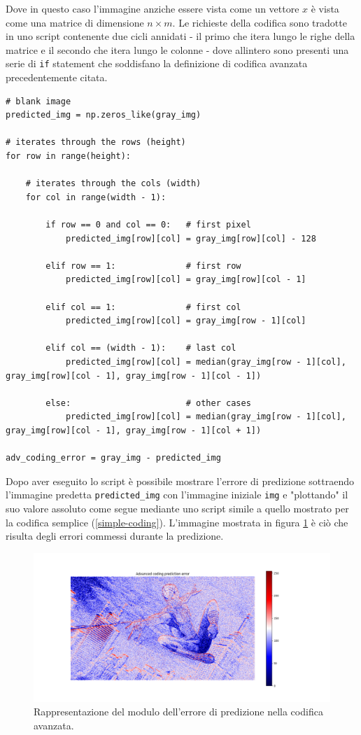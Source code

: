 \noindent Dove in questo caso l'immagine anziche essere vista come un vettore $x$ è vista come una matrice di dimensione $n \times m$. Le richieste della codifica sono tradotte in uno script contenente due cicli annidati - il primo che itera lungo le righe della matrice e il secondo che itera lungo le colonne - dove allintero sono presenti una serie di \texttt{if} statement che soddisfano la definizione di codifica avanzata precedentemente citata.


\begin{lstlisting}
# blank image 
predicted_img = np.zeros_like(gray_img)

# iterates through the rows (height)
for row in range(height):

    # iterates through the cols (width)
    for col in range(width - 1):

        if row == 0 and col == 0:   # first pixel
            predicted_img[row][col] = gray_img[row][col] - 128
        
        elif row == 1:              # first row
            predicted_img[row][col] = gray_img[row][col - 1]
        
        elif col == 1:              # first col
            predicted_img[row][col] = gray_img[row - 1][col]
        
        elif col == (width - 1):    # last col
            predicted_img[row][col] = median(gray_img[row - 1][col], gray_img[row][col - 1], gray_img[row - 1][col - 1])

        else:                       # other cases
            predicted_img[row][col] = median(gray_img[row - 1][col], gray_img[row][col - 1], gray_img[row - 1][col + 1])

adv_coding_error = gray_img - predicted_img
\end{lstlisting}

\noindent Dopo aver eseguito lo script è possibile mostrare l'errore di predizione sottraendo l'immagine predetta \texttt{predicted\_img} con l'immagine iniziale \texttt{img} e "plottando" il suo valore assoluto come segue mediante uno script simile a quello mostrato per la codifica semplice (\ref{simple-coding}). L'immagine mostrata in figura \ref{fig:advanced-coding} è ciò che risulta degli errori commessi durante la predizione.

\begin{figure}[h]
    \centering
    \includegraphics[width = .9\textwidth]{hw-1/report/imgs/advanced-coding.png}
    \caption{Rappresentazione del modulo dell'errore di predizione nella codifica avanzata.}
    \label{fig:advanced-coding}
\end{figure}

